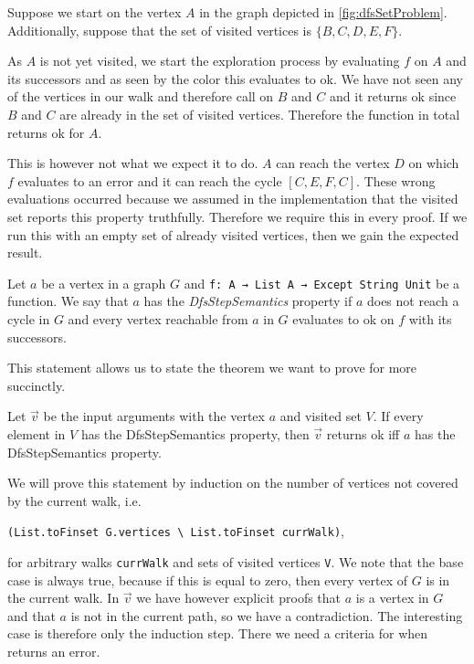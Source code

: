 \begin{example}
  Suppose we start \dfsstep on the vertex $A$ in the graph depicted in \cref{fig:dfsSetProblem}. Additionally, suppose that the set of visited vertices is $\{B,C,D,E,F\}$. 
  
  As $A$ is not yet visited, we start the exploration process by evaluating $f$ on $A$ and its successors and as seen by the color this evaluates to ok. We have not seen any of the vertices in our walk and therefore call \dfsstep on $B$ and $C$ and it returns ok since $B$ and $C$ are already in the set of visited vertices. Therefore the function in total returns ok for $A$.

  This is however not what we expect it to do. $A$ can reach the vertex $D$ on which $f$ evaluates to an error and it can reach the cycle $[C,E,F,C]$. These wrong evaluations occurred because we assumed in the implementation that the visited set reports this property truthfully. Therefore we require this in every proof. If we run this with an empty set of already visited vertices, then we gain the expected result.
\end{example}

\begin{definition}
  Let $a$ be a vertex in a graph $G$ and \lstinline|f: A → List A → Except String Unit| be a function. We say that $a$ has the \textit{DfsStepSemantics} property if $a$ does not reach a cycle in $G$ and every vertex reachable from $a$ in $G$ evaluates to ok on $f$ with its successors.
\end{definition}

This statement allows us to state the theorem we want to prove for \dfsstep more succinctly.

\begin{theorem}[\dfsstepsematics]\label{trm:dfsstepsematics}
  Let $\vec{v}$ be the input arguments with the vertex $a$ and visited set $V$. If every element in $V$ has the DfsStepSemantics property, then \dfsstep $\vec{v}$ returns ok iff $a$ has the DfsStepSemantics property.
\end{theorem}

\noindent We will prove this statement by induction on the number of vertices not covered by the current walk, i.e.

\lstinline|(List.toFinset G.vertices \ List.toFinset currWalk)|,

for arbitrary walks \lstinline|currWalk| and sets of visited vertices \lstinline|V|. We note that the base case is always true, because if this is equal to zero, then every vertex of $G$ is in the current walk. In $\vec{v}$ we have however explicit proofs that $a$ is a vertex in $G$ and that $a$ is not in the current path, so we have a contradiction. The interesting case is therefore only the induction step. There we need a criteria for when \foldlexceptset returns an error.

